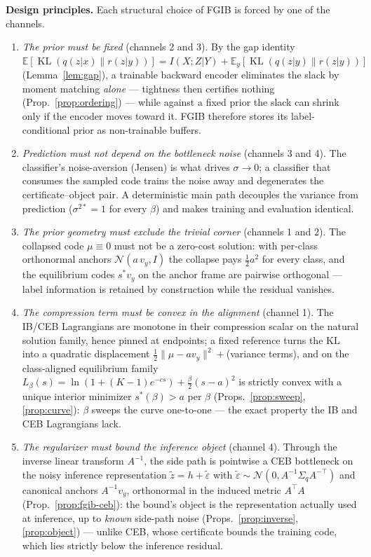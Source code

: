\textbf{Design principles.} Each structural choice of FGIB is forced by one of the
channels.
\begin{enumerate}
\item \emph{The prior must be fixed} (channels 2 and 3). By the gap identity
$\mathbb{E}[\operatorname{KL}(q(z|x)\|r(z|y))] = I(X;Z|Y)
+ \mathbb{E}_y[\operatorname{KL}(q(z|y)\|r(z|y))]$ (Lemma~\ref{lem:gap}), a trainable
backward encoder eliminates the slack by moment matching \emph{alone} --- tightness then
certifies nothing (Prop.~\ref{prop:ordering}) --- while against a fixed prior the slack
can shrink only if the encoder moves toward it. FGIB therefore stores its
label-conditional prior as non-trainable buffers.
\item \emph{Prediction must not depend on the bottleneck noise} (channels 3 and 4). The
classifier's noise-aversion (Jensen) is what drives $\sigma \to 0$; a classifier that
consumes the sampled code trains the noise away and degenerates the certificate--object
pair. A deterministic main path decouples the variance from prediction
($\sigma^{2*} = 1$ for every $\beta$) and makes training and evaluation identical.
\item \emph{The prior geometry must exclude the trivial corner} (channels 1 and 2). The
collapsed code $\mu \equiv 0$ must not be a zero-cost solution: with per-class
orthonormal anchors $\mathcal{N}(a\,v_y, I)$ the collapse pays $\tfrac12 a^2$ for every
class, and the equilibrium codes $s^* v_y$ on the anchor frame are pairwise orthogonal ---
label information is retained by construction while the residual vanishes.
\item \emph{The compression term must be convex in the alignment} (channel 1). The
IB/CEB Lagrangians are monotone in their compression scalar on the natural solution
family, hence pinned at endpoints; a fixed reference turns the KL into a quadratic
displacement $\tfrac12\|\mu - a v_y\|^2 + {}$(variance terms), and on the class-aligned
equilibrium family $L_\beta(s) = \ln(1 + (K-1)e^{-cs}) + \tfrac{\beta}{2}(s-a)^2$ is
strictly convex with a unique interior minimizer $s^*(\beta) > a$ per $\beta$
(Props.~\ref{prop:sweep}, \ref{prop:curve}): $\beta$ sweeps the curve one-to-one --- the
exact property the IB and CEB Lagrangians lack.
\item \emph{The regularizer must bound the inference object} (channel 4). Through
the inverse linear transform $A^{-1}$, the side path is pointwise a CEB bottleneck on the
noisy inference representation $\tilde z = h + \tilde\varepsilon$ with
$\tilde\varepsilon \sim \mathcal{N}(0, A^{-1}\Sigma_q A^{-\top})$ and canonical anchors
$A^{-1}v_y$, orthonormal in the induced metric $A^{\top}A$ (Prop.~\ref{prop:fgib-ceb}):
the bound's object is the representation actually used at inference, up to \emph{known}
side-path noise (Props.~\ref{prop:inverse}, \ref{prop:object}) --- unlike CEB, whose
certificate bounds the training code, which lies strictly below the inference residual.
\end{enumerate}

